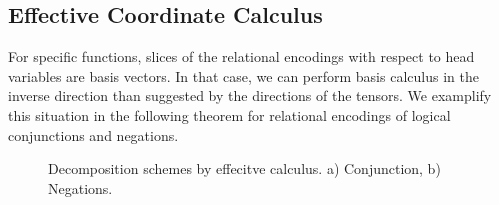 \subsection{Effective Coordinate Calculus}\label{sec:effectiveCalculus} %



For specific functions, slices of the relational encodings with respect to head variables are basis vectors.
In that case, we can perform basis calculus in the inverse direction than suggested by the directions of the tensors.
We examplify this situation in the following theorem for relational encodings of logical conjunctions and negations.

\begin{figure}
\begin{center}
	
\end{center}
\caption{Decomposition schemes by effecitve calculus. a) Conjunction, b) Negations.}\label{fig:ConNegDecomposition}
\end{figure}

